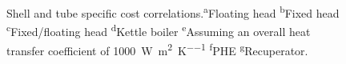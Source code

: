         \begin{figure}[H]
            \centering
            
            \caption[Shell and tube specific cost correlations.]{Shell and tube specific cost correlations.\textsuperscript{a}Floating head \textsuperscript{b}Fixed head \textsuperscript{c}Fixed/floating head \textsuperscript{d}Kettle boiler \textsuperscript{e}Assuming an overall heat transfer coefficient of \qty{1000}{\watt\per\square\m\per\K} \textsuperscript{f}\ac{PHE} \textsuperscript{g}Recuperator.}
            \label{fig:prosim_litrev_SandTHX_speccost}
        \end{figure}





